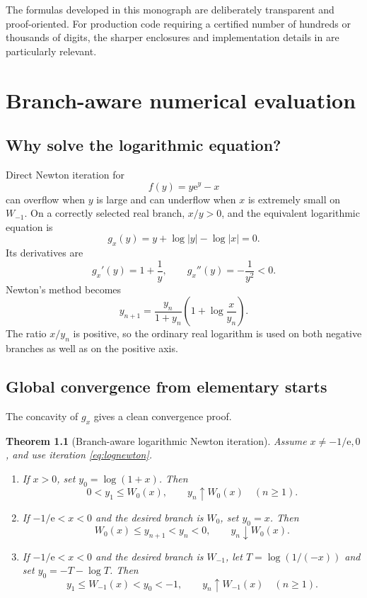 \documentclass[11pt,openany]{book}
\newcommand{\e}{\mathrm{e}}
\newcommand{\abs}[1]{\left|#1\right|}
\theoremstyle{plain}
\newtheorem{theorem}{Theorem}[chapter]
\theoremstyle{definition}
\theoremstyle{remark}
\begin{document}
The formulas developed in this monograph are deliberately transparent and
proof-oriented.  For production code requiring a certified number of hundreds
or thousands of digits, the sharper enclosures and implementation details in
\cite{Loczi2022} are particularly relevant.

\chapter{Branch-aware numerical evaluation}\label{chap:numerics}

\section{Why solve the logarithmic equation?}
Direct Newton iteration for
\[
             f(y)=y\e^y-x
\]
can overflow when \(y\) is large and can underflow when \(x\) is extremely
small on \(W_{-1}\).  On a correctly selected real branch, \(x/y>0\), and the
equivalent logarithmic equation is
\begin{equation}\label{eq:logroot}
        g_x(y)=y+\log\abs y-\log\abs x=0.
\end{equation}
Its derivatives are
\[
        g_x'(y)=1+\frac1y,
        \qquad
        g_x''(y)=-\frac1{y^2}<0.
\]
Newton's method becomes
\begin{equation}\label{eq:lognewton}
 \boxed{
 y_{n+1}=\frac{y_n}{1+y_n}
       \left(1+\log\frac{x}{y_n}\right).
 }
\end{equation}
The ratio \(x/y_n\) is positive, so the ordinary real logarithm is used on
both negative branches as well as on the positive axis.

\section{Global convergence from elementary starts}
The concavity of \(g_x\) gives a clean convergence proof.

\begin{theorem}[Branch-aware logarithmic Newton iteration]
\label{thm:globalnewton}
Assume \(x\ne-1/\e,0\), and use iteration \eqref{eq:lognewton}.

\begin{enumerate}[label=(\alph*)]
\item If \(x>0\), set \(y_0=\log(1+x)\).  Then
\[
       0<y_1\le W_0(x),
       \qquad y_n\uparrow W_0(x)\quad(n\ge1).
\]

\item If \(-1/\e<x<0\) and the desired branch is \(W_0\), set \(y_0=x\).
Then
\[
       W_0(x)\le y_{n+1}<y_n<0,
       \qquad y_n\downarrow W_0(x).
\]

\item If \(-1/\e<x<0\) and the desired branch is \(W_{-1}\), let
\(T=\log(1/(-x))\) and set \(y_0=-T-\log T\).  Then
\[
       y_1\le W_{-1}(x)<y_0<-1,
       \qquad y_n\uparrow W_{-1}(x)\quad(n\ge1).
\]
\end{enumerate}
\end{theorem}
\end{document}
